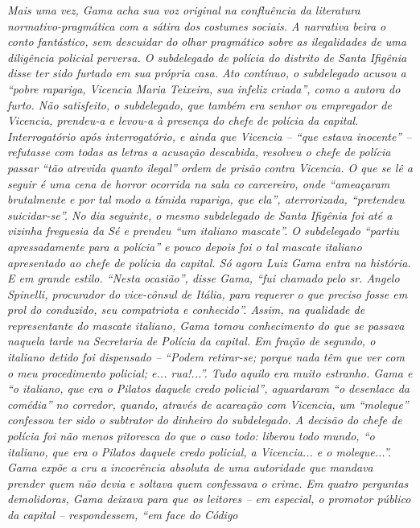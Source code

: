 {\begin{didascalia}
\emph{Mais uma vez, Gama acha sua voz original na confluência da
literatura normativo-pragmática com a sátira dos costumes sociais. A
narrativa beira o conto fantástico, sem descuidar do olhar pragmático
sobre as ilegalidades de uma diligência policial perversa. O subdelegado
de polícia do distrito de Santa Ifigênia disse ter sido furtado em sua
própria casa. Ato contínuo, o subdelegado acusou a ``pobre rapariga,
Vicencia Maria Teixeira, sua infeliz criada'', como a autora do furto.
Não satisfeito, o subdelegado, que também era senhor ou empregador de
Vicencia, prendeu-a e levou-a à presença do chefe de polícia da capital.
Interrogatório após interrogatório, e ainda que Vicencia -- ``que estava
inocente'' -- refutasse com todas as letras a acusação descabida,
resolveu o chefe de polícia passar ``tão atrevida quanto ilegal'' ordem de
prisão contra Vicencia. O que se lê a seguir é uma cena de horror
ocorrida na sala co carcereiro, onde ``ameaçaram brutalmente e por tal
modo a tímida rapariga, que ela'', aterrorizada, ``pretendeu suicidar-se''.
No dia seguinte, o mesmo subdelegado de Santa Ifigênia foi até a vizinha
freguesia da Sé e prendeu ``um italiano mascate''. O subdelegado ``partiu
apressadamente para a polícia'' e pouco depois foi o tal mascate italiano
apresentado ao chefe de polícia da capital. Só agora Luiz Gama entra na
história. E em grande estilo. ``Nesta ocasião'', disse Gama, ``fui chamado
pelo sr. Angelo Spinelli, procurador do vice-cônsul de Itália, para
requerer o que preciso fosse em prol do conduzido, seu compatriota e
conhecido''. Assim, na qualidade de representante do mascate italiano,
Gama tomou conhecimento do que se passava naquela tarde na Secretaria de
Polícia da capital. Em fração de segundo, o italiano detido foi
dispensado -- ``Podem retirar-se; porque nada têm que ver com o meu
procedimento policial; e... rua!...''. Tudo aquilo era muito estranho.
Gama e ``o italiano, que era o Pilatos daquele credo policial'',
aguardaram ``o desenlace da comédia'' no corredor, quando, através de
acareação com Vicencia, um ``moleque'' confessou ter sido o subtrator do
dinheiro do subdelegado. A decisão do chefe de polícia foi não menos
pitoresca do que o caso todo: liberou todo mundo, ``o italiano, que era o
Pilatos daquele credo policial, a Vicencia... e o moleque...''. Gama
expõe a cru a incoerência absoluta de uma autoridade que mandava prender
quem não devia e soltava quem confessava o crime. Em quatro perguntas
demolidoras, Gama deixava para que os leitores -- em especial, o
promotor público da capital -- respondessem, ``em face do Código
}
\end{didascalia}}
